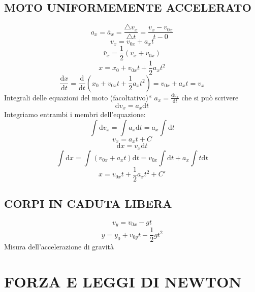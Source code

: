 \documentclass{article}
\begin{document}
\begin{multicols}{2}
		\subsection{MOTO UNIFORMEMENTE ACCELERATO}
			\[ a_x = \bar a_x = \frac{\triangle v_x}{ \triangle t} = \frac{ v_x - v_{0x} }{ t - 0 } \]
			\begin{equation} v_x = v_{0x} + a_x t \end{equation}
			\begin{equation} \bar v_x = \frac{1}{2} ( v_x + v_{0x} ) \end{equation}
			\begin{equation} x = x_0 + v_{0x} t + \frac{1}{2} a_x t^2 \end{equation}
			\[ \frac{\mathrm d x}{\mathrm d t} = \frac{\mathrm d}{\mathrm d t} ( x_0 + v_{0x} t + \frac{1}{2} a_x t^2 ) = v_{0x} + a_x t = v_x \]
			Integrali delle equazioni del moto (facoltativo)*
			$ a_x = \frac{\mathrm d v_x}{\mathrm d t} $ che si può scrivere
			\[ \mathrm d v_x = a_x \mathrm d t \]
			Integriamo entrambi i membri dell'equazione:
			\[ \int \mathrm d v_x = \int a_x \mathrm d t =  a_x \int \mathrm d t \]
			\[ v_x = a_x t + C \]
			\[ \mathrm d x = v_x \mathrm d t \]
			\[ \int \mathrm d x = \int ( v_{0x} + a_x t ) \mathrm d t = v_{0x} \int \mathrm d t + a_x \int t \mathrm d t \]
			\[ x = v_{0x} t + \frac{1}{2} a_x t^2 + C'\]
		\subsection{CORPI IN CADUTA LIBERA}
			\begin{equation} v_y = v_{0x} - g t \end{equation}
			\begin{equation} y = y_0 + v_{0y} t - \frac{1}{2} g t^2 \end{equation}
			Misura dell'accelerazione di gravità

		\end{multicols}
	\section{FORZA E LEGGI DI NEWTON}
		\begin{multicols}{2}

			\begin{equation}  \end{equation}
			\begin{equation}  \end{equation}
			\begin{equation}  \end{equation}
			\begin{equation}  \end{equation}

		\end{multicols}
\end{document}
